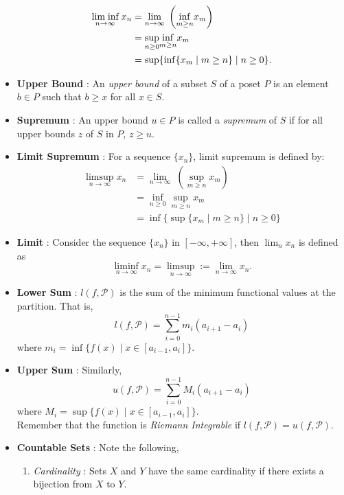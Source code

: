 \documentclass{article}
\theoremstyle{definition}
\theoremstyle{remark}
\theoremstyle{definition}
\theoremstyle{definition}
\theoremstyle{definition}
\newcommand{\lsum}[2]{l(#1,\mathcal{#2})}
\newcommand{\usum}[2]{u(#1,\mathcal{#2})}
\newcommand{\where}{\;\vert\;}
\newcommand{\limit}[2]{\underset{#1}{\lim}\; #2}
\newcommand{\limitinf}[1]{\underset{#1}{\text{lim\;inf}}}
\newcommand{\infim}[1]{\underset{#1}{\inf}}
\newcommand{\suprem}[1]{\underset{#1}{\sup}}
\begin{document}
\begin{itemize}
{\begin{equation}
	\begin{split}
	\limitinf{n\to\infty}\; x_n &= \limit{n\to \infty}{\left ( \infim{m\ge n} x_m \right )}\\
	&= \suprem{n\ge 0} \infim{m\ge n} x_m\\
	 &= \sup \{\inf\{x_m \where m\ge n\}\where n\ge 0\}.
	\end{split}
\end{equation}
}
	\item {\textbf{Upper Bound} : An \emph{upper bound} of a subset $ S $ of a poset $  P$ is an element $ b\in P $ such that $ b\ge x $ for all $ x\in S $.}
	\item {\textbf{Supremum} : An upper bound $ u\in P $ is called a \emph{supremum} of $ S $ if for all upper bounds $ z $ of $ S $ in $ P $, $ z \ge u $.}
	\item {\textbf{Limit Supremum} :  For a sequence $ \{x_n\} $, limit supremum is defined by:
	\begin{equation}\label{limsup}
		\begin{split}
			\limsup_{n\to \infty} x_n &= \limit{n\to \infty}{\left (\sup_{m\ge n} x_m\right )}\\
			&= \inf_{n\ge 0} \sup_{m\ge n} x_m\\
			&= \inf \{\sup\{x_m \where m\ge n\}\where n\ge 0\}
		\end{split}
	\end{equation}}
\item {\textbf{Limit} : Consider the sequence $ \{x_n\} $ in $ [-\infty,+\infty] $, then $ \lim_{n} x_n $ is defined as
	\[\liminf_{n\to \infty} x_n = \limsup_{n\to\infty} := \lim_{n\to \infty} x_n.\]
}
	\item {\textbf{Lower Sum} : $ l(f,\mathcal{P}) $ is the sum of the minimum functional values at the partition. That is,
		\[\lsum{f}{P} = \sum_{i=0}^{n-1} m_i (a_{i+1} - a_i)\]
		where $ m_i = \inf\{f(x)\;\vert\;x\in [a_{i-1},a_i]\}$.}
	\item {\textbf{Upper Sum} : Similarly,
		\[\usum{f}{P} = \sum_{i=0}^{n-1} M_i (a_{i+1} - a_i)\]
		where $ M_i = \sup\{f(x)\where x\in [a_{i-1},a_i] \} $.\\
		Remember that the function is \emph{Riemann Integrable} if $ l(f,\mathcal{P}) = u(f,\mathcal{P}) $.}
	\item{\textbf{Countable Sets} : Note the following,
\begin{enumerate}
	\item{\emph{Cardinality} : Sets $ X $ and $ Y $ have the same cardinality if there exists a bijection from $ X $ to $ Y $.}

\end{enumerate}}
\end{itemize}
\end{document}
